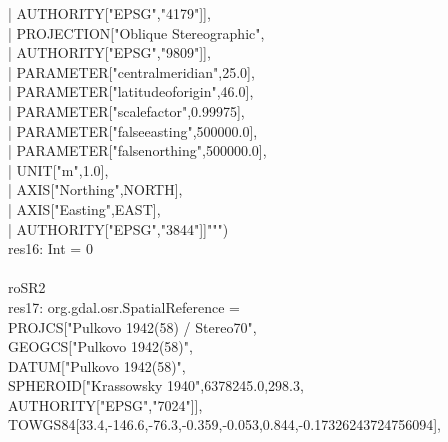 \documentclass {article}
\begin{document}
 |\hspace*{4mm} AUTHORITY["EPSG","4179"]],\\
 |\hspace*{2mm} PROJECTION["Oblique Stereographic",\\
 |\hspace*{4mm} AUTHORITY["EPSG","9809"]],\\
 |\hspace*{2mm} PARAMETER["central\underline{\space}meridian",25.0],\\
 |\hspace*{2mm} PARAMETER["latitude\underline{\space}of\underline{\space}origin",46.0],\\
 |\hspace*{2mm} PARAMETER["scale\underline{\space}factor",0.99975],\\
 |\hspace*{2mm} PARAMETER["false\underline{\space}easting",500000.0],\\
 |\hspace*{2mm} PARAMETER["false\underline{\space}northing",500000.0],\\
 |\hspace*{2mm} UNIT["m",1.0],\\
 |\hspace*{2mm} AXIS["Northing",NORTH],\\
 |\hspace*{2mm} AXIS["Easting",EAST],\\
 |\hspace*{2mm} AUTHORITY["EPSG","3844"]]""")\\
res16: Int = 0\\
\\
roSR2\\
res17: org.gdal.osr.SpatialReference =\\
PROJCS["Pulkovo 1942(58) / Stereo70",\\
\hspace*{2mm} GEOGCS["Pulkovo 1942(58)",\\
\hspace*{4mm} DATUM["Pulkovo 1942(58)",\\
\hspace*{6mm} SPHEROID["Krassowsky 1940",6378245.0,298.3,\\
\hspace*{8mm} AUTHORITY["EPSG","7024"]],\\
\hspace*{6mm} TOWGS84[33.4,-146.6,-76.3,-0.359,-0.053,0.844,-0.17326243724756094],\\
\end{document}
